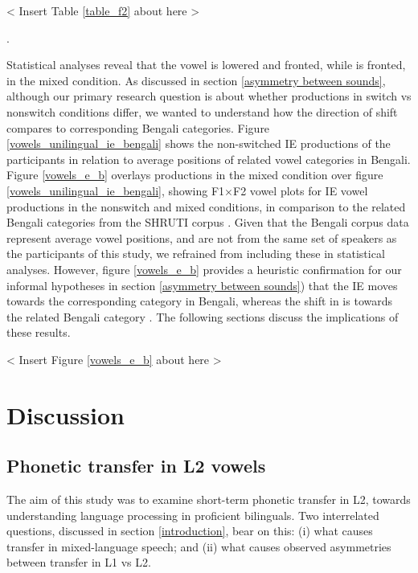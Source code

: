 \documentclass[12 pt]{article}
\newcommand{\nt}[1]{\textipa{[#1]}} %
\begin{document}
< Insert Table \ref{table_f2} about here >

.

Statistical analyses reveal that the vowel \nt{2} is lowered and fronted, while \nt{\ae} is fronted, in the mixed condition. As discussed in section \ref{asymmetry between sounds}, although our primary research question is about whether productions in switch vs nonswitch conditions differ, we wanted to understand how the direction of shift compares to corresponding Bengali categories. Figure \ref{vowels_unilingual_ie_bengali} shows the non-switched IE productions of the participants in relation to average positions of related vowel categories in Bengali. Figure \ref{vowels_e_b} overlays productions in the mixed condition over figure \ref{vowels_unilingual_ie_bengali}, showing F1$\times$F2 vowel plots for IE vowel productions in the nonswitch and mixed conditions, in comparison to the related Bengali categories from the SHRUTI corpus \citep{shruticorpus}. Given that the Bengali corpus data represent average vowel positions, and are not from the same set of speakers as the participants of this study, we refrained from including these in statistical analyses. However, figure \ref{vowels_e_b} provides a heuristic confirmation for our informal hypotheses in section \ref{asymmetry between sounds}) that the IE \nt{\ae} moves towards the corresponding \nt{\ae} category in Bengali, whereas the shift in \nt{2} is towards the related Bengali category \nt{a:}. The following sections discuss the implications of these results.

< Insert Figure \ref{vowels_e_b} about here >

\section{Discussion}


\subsection{Phonetic transfer in L2 vowels}

The aim of this study was to examine short-term phonetic transfer in L2, towards understanding language processing in proficient bilinguals. Two interrelated questions, discussed in section \ref{introduction}, bear on this: (i) what causes transfer in mixed-language speech; and (ii) what causes observed asymmetries between transfer in L1 vs L2. 
\end{document}
